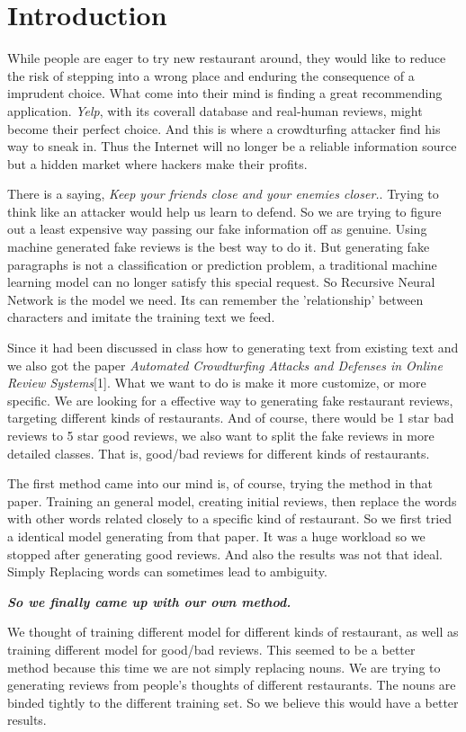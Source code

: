 \documentclass[conference]{IEEEtran}
\begin{document}
\section{Introduction}
While people are eager to try new restaurant around, they would like to reduce the risk of stepping into a wrong place and enduring the consequence of a imprudent choice. What come into their mind is finding a great recommending application. \emph{Yelp}, with its coverall database and real-human reviews, might become their perfect choice. And this is where a crowdturfing attacker find his way to sneak in. Thus the Internet will no longer be a reliable information source but a hidden market where hackers make their profits.
\par There is a saying, \emph{Keep your friends close and your enemies closer.}. Trying to think like an attacker would help us learn to defend. So we are trying to figure out a least expensive way passing our fake information off as genuine. Using machine generated fake reviews is the best way to do it. But generating fake paragraphs is not a classification or prediction problem, a traditional machine learning model can no longer satisfy this special request. So Recursive Neural Network is the model we need. Its can remember the 'relationship' between characters and imitate the training text we feed. 
\par Since it had been discussed in class how to generating text from existing text and we also got the paper \emph{Automated Crowdturfing Attacks and Defenses in Online Review Systems}[1]. What we want to do is make it more customize, or more specific. We are looking for a effective way to generating fake restaurant reviews, targeting different kinds of restaurants. And of course, there would be 1 star bad reviews to 5 star good reviews, we also want to split the fake reviews in more detailed classes. That is, good/bad reviews for different kinds of restaurants. 
\par The first method came into our mind is, of course, trying the method in that paper. Training an general model, creating initial reviews, then replace the words with other words related closely to a specific kind of restaurant. So we first tried a identical model generating from that paper. It was a huge workload so we stopped after generating good reviews. And also the results was not that ideal. Simply Replacing words can sometimes lead to ambiguity.
\par \emph{\textbf{So we finally came up with our own method.}}
\par We thought of training different model for different kinds of restaurant, as well as training different model for good/bad reviews. This seemed to be a better method because this time we are not simply replacing nouns. We are trying to generating reviews from people's thoughts of different restaurants. The nouns are binded tightly to the different training set. So we believe this would have a better results.
\end{document}
